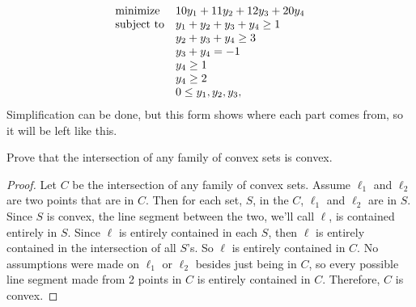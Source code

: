 \documentclass[12pt]{article}
\newenvironment{exercise}[2][Exercise]{\begin{trivlist}
\item[\hskip \labelsep {\bfseries #1}\hskip \labelsep {\bfseries #2.}]}{\end{trivlist}}
\begin{document}
\begin{exercise}{2}
\begin{equation*}
	\begin{array}{ll@{}ll}
		\text{minimize}  & \displaystyle 10y_1 + 11y_2 + 12y_3 + 20y_4 &\\
		\text{subject to}& \displaystyle y_1 + y_2 + y_3 + y_4 \geq 1 &\\
		& \displaystyle  y_2 + y_3 + y_4 \geq 3 &\\
		& \displaystyle  y_3 + y_4 = -1 &\\
		& \displaystyle  y_4 \geq 1 &\\
		& \displaystyle  y_4 \geq 2 &\\
		& \displaystyle 0 \leq y_1,y_2,y_3,
	\end{array}
\end{equation*}
Simplification can be done, but this form shows where each part comes from, so it will be left like this.
\end{exercise}

\begin{exercise}{3} Prove that the intersection of any family of convex sets is convex.
	\begin{proof}
		Let $C$ be the intersection of any family of convex sets. Assume $\ell_1$ and $\ell_2$ are two points that are in $C$. Then for each set, $S$, in the $C$, $\ell_1$ and $\ell_2$ are in $S$. Since $S$ is convex, the line segment between the two, we'll call $\ell$, is contained entirely in $S$. Since $\ell$ is entirely contained in each $S$, then $\ell$ is entirely contained in the intersection of all $S$'s. So $\ell$ is entirely contained in $C$. No assumptions were made on $\ell_1$ or $\ell_2$ besides just being in $C$, so every possible line segment made from 2 points in $C$ is entirely contained in $C$. Therefore, $C$ is convex.
	\end{proof}
\end{exercise}
\end{document}
